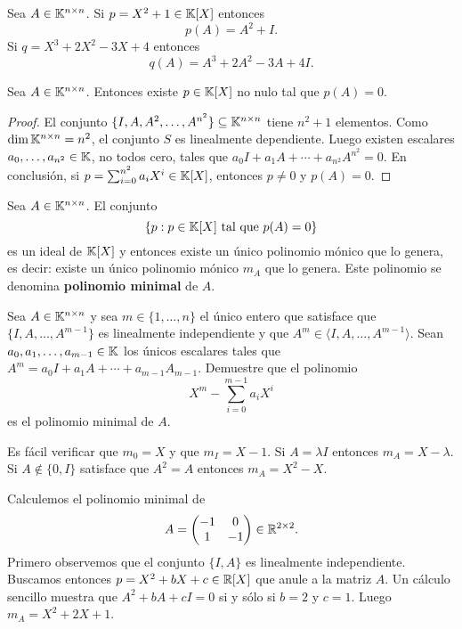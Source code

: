 \begin{examples}
	Sea $A\in\mathbb{K}^{n\times n}$. 
	Si $p=X^2+1\in\mathbb{K}[X]$ entonces 
	\[
	p(A)=A^2+I.
	\]
	Si $q=X^3+2X^2-3X+4$ entonces 
	\[
	q(A)=A^3+2A^2-3A+4I.
	\]
\end{examples}

\begin{lem}
    Sea $A\in\mathbb{K}^{n\times n}$. Entonces existe $p\in\mathbb{K}[X]$ no nulo tal que
    $p(A)=0$. 
\end{lem}

\begin{proof}
    El conjunto $\{I,A,A^2,\dots,A^{n^2}\}\subseteq\mathbb{K}^{n\times n}$ tiene
    $n^2+1$ elementos. Como $\dim\mathbb{K}^{n\times n}=n^2$, el conjunto $S$ es
    linealmente dependiente. Luego existen escalares $a_0,\dots,a_{n^2}\in\mathbb{K}$,
    no todos cero, tales que $a_0I+a_1A+\cdots+a_{n^2}A^{n^2}=0$.  En
    conclusión, si $p=\sum_{i=0}^{n^2}a_iX^i\in\mathbb{K}[X]$, entonces $p\ne0$ y
    $p(A)=0$.
\end{proof}

\begin{block}
	Sea $A\in\mathbb{K}^{n\times n}$. El conjunto 
	\[
		\{p:p\in\mathbb{K}[X]\text{ tal que $p(A)=0$}\}
	\]
	es un ideal de $\mathbb{K}[X]$ y entonces existe un único polinomio mónico que lo
	genera, es decir: existe un único polinomio mónico $m_A$ que lo genera. 
	Este polinomio se denomina \textbf{polinomio minimal} de $A$. 
\end{block}

\begin{xca}
	\label{xca:minimal}
	Sea $A\in\mathbb{K}^{n\times n}$ y sea $m\in\{1,\dots,n\}$ el único entero que
	satisface que $\{I,A,\dots,A^{m-1}\}$ es linealmente independiente y que
	$A^m\in\langle I,A,\dots,A^{m-1}\rangle$. Sean $a_0,a_1,\dots,a_{m-1}\in\mathbb{K}$
	los únicos escalares tales que $A^m=a_0I+a_1A+\cdots+a_{m-1}A_{m-1}$.
	Demuestre que el polinomio \[
        X^m-\sum_{i=0}^{m-1}a_iX^i
    \]
    es el polinomio minimal de $A$.
\end{xca}

\begin{examples}
	Es fácil verificar que $m_0=X$ y que $m_I=X-1$. Si $A=\lambda I$ entonces
	$m_A=X-\lambda$. Si $A\not\in\{0,I\}$ satisface que $A^2=A$ entonces
	$m_A=X^2-X$.
\end{examples}

\begin{example}
	Calculemos el polinomio minimal de 
	\[
		A=\begin{pmatrix}-1&0\\1&-1\end{pmatrix}\in\mathbb{R}^{2\times2}.
	\]
	Primero observemos que el conjunto $\{I,A\}$ es linealmente independiente.
	Buscamos entonces $p=X^2+bX+c\in\mathbb{R}[X]$ que anule a la matriz $A$. Un
	cálculo sencillo muestra que $A^2+bA+cI=0$ si y sólo si $b=2$ y $c=1$.
	Luego $m_A=X^2+2X+1$. 
\end{example}

